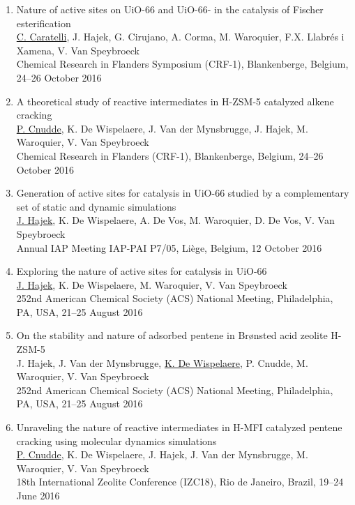 \begin{enumerate}
\item 
Nature of active sites on UiO-66 and
UiO-66- in the catalysis of Fischer esterification\\
\underline{C. Caratelli}, J. Hajek, G. Cirujano, A. Corma, M. Waroquier, F.X.
Llabr\'es i Xamena, V. Van Speybroeck\\
Chemical Research in Flanders Symposium (CRF-1), Blankenberge, Belgium, 24--26
October 2016

\item
A theoretical study of reactive intermediates in H-ZSM-5 catalyzed alkene
cracking\\
\underline{P. Cnudde}, K. De Wispelaere, J. Van der Mynsbrugge, J.
Hajek, M.
Waroquier, V.
Van Speybroeck\\ Chemical Research in Flanders (CRF-1), Blankenberge, Belgium,
24--26 October 2016
\item
Generation of active sites for catalysis in UiO-66 studied by a complementary set of static and dynamic simulations\\
\underline{J. Hajek}, K. De Wispelaere, A. De Vos, M. Waroquier, D. De Vos, V.
Van Speybroeck \\
Annual IAP Meeting IAP-PAI P7/05, Li\`ege, Belgium, 12 October 2016

\item 
Exploring the nature of active sites for catalysis in UiO-66\\
\underline{J. Hajek}, K. De Wispelaere, M. Waroquier, V. Van Speybroeck \\
252nd American Chemical Society (ACS) National Meeting, Philadelphia, PA,
USA, 21--25 August 2016

\item
On the stability and nature of adsorbed pentene in Br\o{}nsted acid zeolite
H-ZSM-5\\
J. Hajek, J. Van der Mynsbrugge, \underline{K. De Wispelaere}, P. Cnudde, M.
Waroquier, V. Van Speybroeck\\
252nd American Chemical Society (ACS) National Meeting, Philadelphia, PA,
USA, 21--25 August 2016

\item
Unraveling the nature of reactive intermediates in H-MFI catalyzed pentene cracking using molecular dynamics simulations\\
\underline{P. Cnudde}, K. De Wispelaere, J. Hajek, J. Van der Mynsbrugge, M.
Waroquier, V. Van Speybroeck\\
18th International Zeolite Conference (IZC18), Rio de Janeiro, Brazil, 19--24
June 2016


\end{enumerate}
